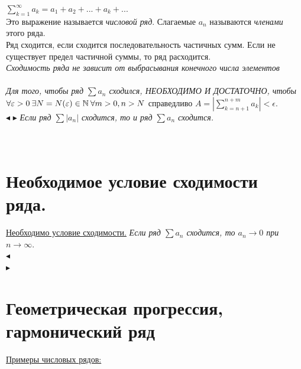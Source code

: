$\sum_{k=1}^{\infty} a_k = a_1 + a_2 + ... + a_k + ...$ \\
Это выражение называется \textit{числовой ряд}. Слагаемые $a_n$ называются \textit{членами} этого ряда.\\
Ряд сходится, если сходится последовательность частичных сумм. Если не существует предел частичной суммы, то ряд расходится.\\
\textit{Сходимость ряда не зависит от выбрасывания конечного числа элементов}\\
 \\
\textit{Для того, чтобы ряд $\sum a_n$ сходился, НЕОБХОДИМО И ДОСТАТОЧНО,
чтобы}\\
$\forall \varepsilon > 0 \: \exists N = N(\varepsilon) \in \mathbb{N} \: \forall m > 0, n > N$ справедливо $A = |\sum_{k=n+1}^{n+m} a_k| < \epsilon.$\\
$\blacktriangleleft$
 $\blacktriangleright$
 \textit{Если ряд $\sum |a_n|$ сходится, то и ряд $\sum a_n$ сходится.} \\
\\
\\


\section{Необходимое условие сходимости ряда.}

\underline{Необходимо условие сходимости.}  \textit{Если ряд $\sum a_n$ сходится, то $a_n \rightarrow 0$ при $n \rightarrow \infty.$}\\
$\blacktriangleleft$
\\
 $\blacktriangleright$ \\



\section{Геометрическая прогрессия, гармонический ряд}

\underline{Примеры числовых рядов:}

